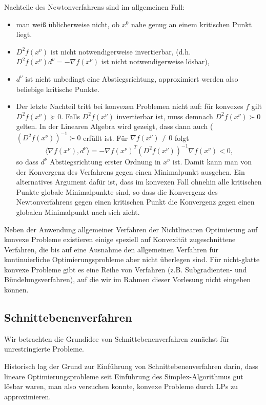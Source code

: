 \documentclass[12pt]{extreport} %
\theoremstyle{named}
\theoremstyle{nnamed}
\theoremstyle{itshape}
\theoremstyle{normal}
\begin{document}
	Nachteile des Newtonverfahrens sind im allgemeinen Fall:
	\begin{itemize}
		\item man weiß üblicherweise nicht, ob $x^0$ nahe genug an einem kritischen Punkt liegt.
		\item $D^2 f(x^\nu)$ ist nicht notwendigerweise invertierbar, (d.h. $D^2 f(x^\nu) d^\nu = - \nabla f(x^\nu)$ ist nicht notwendigerweise lösbar),
		\item $d^\nu$ ist nicht unbedingt eine Abstiegsrichtung, approximiert werden also beliebige kritische Punkte.
		\item Der letzte Nachteil tritt bei konvexen Problemen nicht auf: für konvexes $f$ gilt $D^2 f(x^\nu) \succeq 0$. Falls $D^2 f(x^\nu)$ invertierbar ist, muss demnach $D^2 f(x^\nu) \succ 0$ gelten. In der Linearen Algebra wird gezeigt, dass dann auch ($\left(D^2 f(x^\nu) \right)^{-1} \succ 0$ erfüllt ist. Für $\nabla f(x^\nu) \neq 0$ folgt
				$$ \langle \nabla f(x^\nu), d^\nu \rangle = - \nabla f(x^\nu)^T \left( D^2 f(x^\nu) \right)^{-1} \nabla f(x^\nu) < 0, $$
			so dass $d^\nu$ Abstiegsrichtung erster Ordnung in $x^\nu$ ist. Damit kann man von der Konvergenz des Verfahrens gegen einen Minimalpunkt ausgehen. Ein alternatives Argument dafür ist, dass im konvexen Fall ohnehin alle kritischen Punkte globale Minimalpunkte sind, so dass die Konvergenz des Newtonverfahrens gegen einen kritischen Punkt die Konvergenz gegen einen globalen Minimalpunkt nach sich zieht.
	\end{itemize}
	
Neben der Anwendung allgemeiner Verfahren der Nichtlinearen Optimierung auf konvexe Probleme existieren einige speziell auf Konvexität zugeschnittene Verfahren, die bis auf eine Ausnahme den allgemeinen Verfahren für kontinuierliche Optimierungsprobleme aber nicht überlegen sind. Für nicht-glatte konvexe Probleme gibt es eine Reihe von Verfahren (z.B. Subgradienten- und Bündelungsverfahren), auf die wir im Rahmen dieser Vorlesung nicht eingehen können.

\subsection*{Schnittebenenverfahren}

Wir betrachten die Grundidee von Schnittebenenverfahren zunächst für unrestringierte Probleme. ~\bigskip

Historisch lag der Grund zur Einführung von Schnittebenenverfahren darin, dass lineare Optimierungsprobleme seit Einführung des Simplex-Algorithmus gut lösbar waren, man also versuchen konnte, konvexe Probleme durch LPs zu approximieren. ~\bigskip
\end{document}
